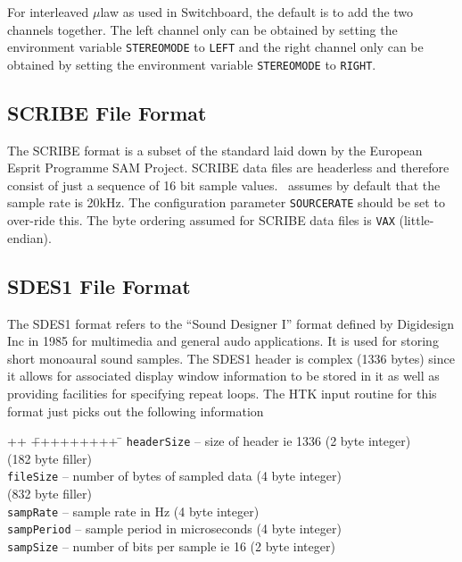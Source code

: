 For interleaved $\mu$law as used in Switchboard, the default is to add the two
channels together.  The left channel only can be obtained by setting the
environment variable \texttt{STEREOMODE} to \texttt{LEFT} and the right channel
only can be obtained by setting the environment variable \texttt{STEREOMODE} to
\texttt{RIGHT}.   

\subsection{SCRIBE File Format}

The SCRIBE format is a subset of the standard laid down by the European Esprit
Programme SAM Project.  SCRIBE data files are headerless and therefore consist
of just a sequence of 16 bit sample values.  \HTK\ assumes by default that the
sample rate is 20kHz.  The configuration parameter \texttt{SOURCERATE} should
be set to over-ride this.  The byte ordering assumed for SCRIBE data files is
\texttt{VAX} (little-endian).

\subsection{SDES1 File Format}

The SDES1 format refers to the ``Sound Designer I'' format defined by
Digidesign Inc in 1985 for multimedia and general audo applications.  It is
used for storing short monoaural sound samples.  The SDES1 header is complex
(1336 bytes) since it allows for associated display window information to be
stored in it as well as providing facilities for specifying repeat loops.  The
HTK input routine for this format just picks out the following information
\begin{tabbing}
++ \= +++++++++ \= \kill
\>\texttt{headerSize}  \>-- size of header ie 1336 (2 byte integer) \\
\>(182 byte filler) \\
\>\texttt{fileSize} \>-- number of bytes of sampled data (4 byte integer)\\
\>(832 byte filler) \\
\>\texttt{sampRate} \>-- sample rate in Hz (4 byte integer) \\
\>\texttt{sampPeriod} \>-- sample period in microseconds (4 byte integer) \\ 
\>\texttt{sampSize} \>-- number of bits per sample ie 16 (2 byte integer)
\end{tabbing}

